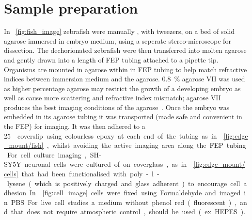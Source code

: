\section{Sample preparation}

In \figurename~\ref{fig:fish_image} \gls{zebrafish} were manually , with tweezers, on a bed of solid agarose immersed in embryo medium, using a seperate stereo-microscope for dissection.
The dechorionated \gls{zebrafish} were then transferred into molten agarose and gently drawn into a length of \gls{FEP} tubing attached to a pipette tip.
Organisms are mounted in agarose within in \gls{FEP} tubing to help match refractive indices between immersion medium and the agarose.
\SI{0.8}{\percent} \gls{agarose VII} was used as higher percentage agarose may restrict the growth of a developing embryo as well as cause more scattering and refractive index mismatch; \gls{agarose VII} produces the best imaging conditions of the agarose~\cite{floodUsingHydrogelsMicroscopy2016}.
Once the embryo was embedded in its agarose tubing it was transported (made safe and convenient in the \gls{FEP}) for imaging.
It was then adhered to a \SI{25}{\milli\metre\square} coverslip using colourless epoxy at each end of the tubing as in \figurename~\ref{fig:edge_mount/fish}, whilst avoiding the active imaging area along the \gls{FEP} tubing.

For cell culture imaging, \gls{SH-SY5Y} neuronal cells were cultured of on coverglass, as in \figurename~\ref{fig:edge_mount/cells} that had been functionalised with poly-l-lysene (which is positively charged and glass adherent) to encourage cell adhesion.
In \figurename~\ref{fig:cell_image} cells were fixed using Formaldehyde and imaged in \gls{PBS}.
For live cell studies a medium without phenol red (fluorescent), and that does not require atmospheric control, should be used (ex. HEPES).

